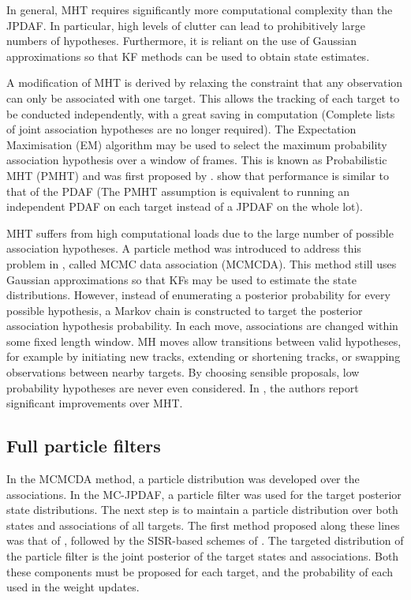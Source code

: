In general, MHT requires significantly more computational complexity than the JPDAF. In particular, high levels of clutter can lead to prohibitively large numbers of hypotheses. Furthermore, it is reliant on the use of Gaussian approximations so that KF methods can be used to obtain state estimates. 

A modification of MHT is derived by relaxing the constraint that any observation can only be associated with one target. This allows the tracking of each target to be conducted independently, with a great saving in computation (Complete lists of joint association hypotheses are no longer required). The Expectation Maximisation (EM) algorithm may be used to select the maximum probability association hypothesis over a window of frames. This is known as Probabilistic MHT (PMHT) and was first proposed by \cite{Streit1994}. \cite{Willett2002} show that performance is similar to that of the PDAF (The PMHT assumption is equivalent to running an independent PDAF on each target instead of a JPDAF on the whole lot).

MHT suffers from high computational loads due to the large number of possible association hypotheses. A particle method was introduced to address this problem in \cite{Oh2004}, called MCMC data association (MCMCDA). This method still uses Gaussian approximations so that KFs may be used to estimate the state distributions. However, instead of enumerating a posterior probability for every possible hypothesis, a Markov chain is constructed to target the posterior association hypothesis probability. In each move, associations are changed within some fixed length window. MH moves allow transitions between valid hypotheses, for example by initiating new tracks, extending or shortening tracks, or swapping observations between nearby targets. By choosing sensible proposals, low probability hypotheses are never even considered. In \cite{Oh2004,Oh2009}, the authors report significant improvements over MHT.



\subsection{Full particle filters}
In the MCMCDA method, a particle distribution was developed over the associations. In the MC-JPDAF, a particle filter was used for the target posterior state distributions. The next step is to maintain a particle distribution over both states and associations of all targets. The first method proposed along these lines was that of \cite{Hue2002}, followed by the SISR-based schemes of \cite{Doucet2002,Vermaak2005}. The targeted distribution of the particle filter is the joint posterior of the target states and associations. Both these components must be proposed for each target, and the probability of each used in the weight updates.

